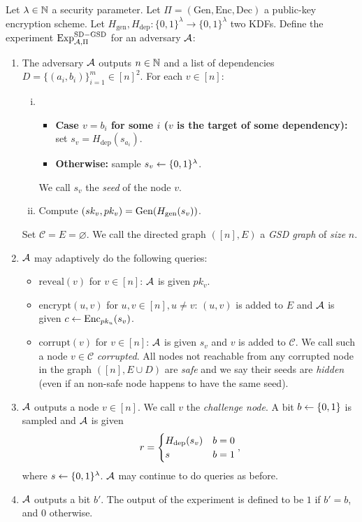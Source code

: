 \begin{definition}

	Let $\lambda \in \mathbb{N}$ a security parameter.  Let $\Pi = (\mathrm{Gen}, \mathrm{Enc}, \mathrm{Dec})$ a public-key encryption scheme. Let $H_{\mathrm{gen}}, H_{\mathrm{dep}} \colon \{0, 1\}^\lambda \to \{0, 1\}^\lambda$ two KDFs. Define the experiment $\mathrm{Exp}_{\mathcal{A}, \Pi}^{\mathrm{SD-GSD}}$ for an adversary $\mathcal{A}$:
	\begin{enumerate}[1.]
		\item The adversary $\mathcal{A}$ outputs $n \in \mathbb{N}$ and a list of dependencies $D = \{(a_{i}, b_{i})\}_{i=1}^m \in [n]^2$. For each $v \in [n]$:
		      \begin{enumerate}[(i)]
			      \item \begin{itemize}
				            \item \textbf{Case $v = b_i$ for some $i$ ($v$ is the target of some dependency):} set $s_v = H_{\mathrm{dep}}(s_{a_i})$.
				            \item \textbf{Otherwise:} sample $s_v \leftarrow \{0, 1\}^\lambda$.
			            \end{itemize}
			            We call $s_v$ the \emph{seed} of the node $v$.
			      \item Compute $(sk_v, pk_v) = \mathrm{Gen}(H_\mathrm{gen}(s_v))$. 
		      \end{enumerate}
		      Set $\mathcal{C} = E = \varnothing$. We call the directed graph $([n], E)$ a \emph{GSD graph} of \emph{size} $n$.
		\item $\mathcal{A}$ may adaptively do the following queries:
		      \begin{itemize}
			      \item $\mathrm{reveal}(v)$ for $v \in [n]$: $\mathcal{A}$ is given $pk_v$.
			      \item $\mathrm{encrypt}(u, v)$ for $u, v \in [n], u \neq v$: $(u, v)$ is added to $E$ and $\mathcal{A}$ is given $c \leftarrow \mathrm{Enc}_{pk_u}(s_v)$.
			      \item $\mathrm{corrupt}(v)$ for $v \in [n]$: $\mathcal{A}$ is given $s_v$ and $v$ is added to $\mathcal{C}$. We call such a node $v \in \mathcal{C}$ \emph{corrupted}. All nodes not reachable from any corrupted node in the graph $([n], E \cup D)$ are \emph{safe} and we say their seeds are \emph{hidden} (even if an non-safe node happens to have the same seed).
		      \end{itemize}
		\item $\mathcal{A}$ outputs a node $v \in [n]$. We call $v$ the \emph{challenge node}. A bit $b \leftarrow \{0, 1\}$ is sampled and $\mathcal{A}$ is given
		      \[
			      r = \begin{cases}
				      H_\mathrm{dep}(s_v) & b = 0 \\
				      s          & b = 1
			      \end{cases},
		      \]
		      where $s \leftarrow \{0, 1\}^\lambda$. $\mathcal{A}$ may continue to do queries as before.
		\item $\mathcal{A}$ outputs a bit $b'$. The output of the experiment is defined to be $1$ if $b' = b$, and $0$ otherwise.
	\end{enumerate}


\end{definition}
